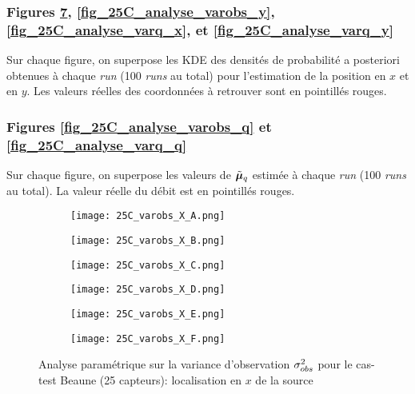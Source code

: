 \subsubsection*{Figures \ref{fig_25C_analyse_varobs_x}, \ref{fig_25C_analyse_varobs_y}, \ref{fig_25C_analyse_varq_x}, 
et \ref{fig_25C_analyse_varq_y}}
Sur chaque figure, on superpose les KDE des densités de probabilité a posteriori obtenues à chaque \textit{run} (100 \textit{runs} au total) pour l'estimation de la position en $x$ et en $y$. Les valeurs réelles des coordonnées à retrouver sont en pointillés rouges.

\subsubsection*{Figures \ref{fig_25C_analyse_varobs_q} et \ref{fig_25C_analyse_varq_q}}

Sur chaque figure, on superpose les valeurs de $\tilde{{\bm{\mu}}}_q$ estimée à chaque \textit{run} (100 \textit{runs} au total). La valeur réelle du débit est en pointillés rouges.
 
 
  \begin{figure}[p!]
  	\centering
  	\begin{subfigure}[t]{0.5\textwidth}
  		\centering
  		\texttt{[image: 25C\_varobs\_X\_A.png]}
  		\caption{}
  		\label{varA_x}
  	\end{subfigure}%
  	\begin{subfigure}[t]{0.5\textwidth}
  		\centering
  		\texttt{[image: 25C\_varobs\_X\_B.png]}
  		\caption{}
  		\label{varB_x}
  	\end{subfigure}
	  	\begin{subfigure}[t]{0.5\textwidth}
	  		\centering
	  		\texttt{[image: 25C\_varobs\_X\_C.png]}
	  		\caption{}
	  		\label{varC_x}
	  	\end{subfigure}%
	  	\begin{subfigure}[t]{0.5\textwidth}
	  		\centering
	  		\texttt{[image: 25C\_varobs\_X\_D.png]}
	  		\caption{}
	  		\label{varD_x}
	  	\end{subfigure}
	   	\begin{subfigure}[t]{0.5\textwidth}
	   		\centering
	   		\texttt{[image: 25C\_varobs\_X\_E.png]}
	   		\caption{}
	   		\label{varE_x}
	   	\end{subfigure}%
	   	\begin{subfigure}[t]{0.5\textwidth}
	   		\centering
	   		\texttt{[image: 25C\_varobs\_X\_F.png]}
	   		\caption{}
	   		\label{varF_x}
	   	\end{subfigure}
	   	\caption{Analyse paramétrique sur la variance d'observation ${\sigma_{obs}^2}$ pour le cas-test Beaune (25 capteurs): localisation en $x$ de la source}
	   	\label{fig_25C_analyse_varobs_x}

  \end{figure}
  
